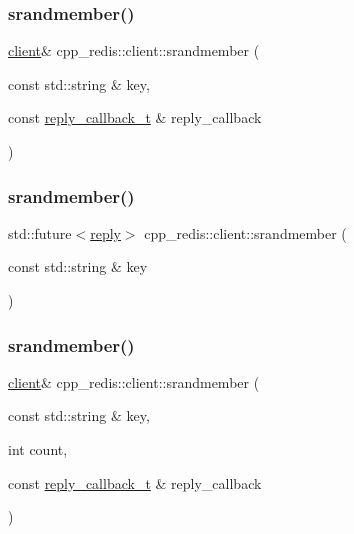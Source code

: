 \mbox{\label{classcpp__redis_1_1client_a69e771fb9562fca08cbf653f8ecb295b}} 
\subsubsection{\texorpdfstring{srandmember()}{srandmember()}\hspace{0.1cm}{\footnotesize\ttfamily [1/4]}}
{\footnotesize\ttfamily \hyperlink{classcpp__redis_1_1client}{client}\& cpp\+\_\+redis\+::client\+::srandmember (\begin{DoxyParamCaption}\item[{const std\+::string \&}]{key,  }\item[{const \hyperlink{classcpp__redis_1_1client_a061a1140d36d2eaeda82b09a0bb3f9f2}{reply\+\_\+callback\+\_\+t} \&}]{reply\+\_\+callback }\end{DoxyParamCaption})}

\mbox{\label{classcpp__redis_1_1client_a2a110009cac1bb5063d468df91802395}} 
\subsubsection{\texorpdfstring{srandmember()}{srandmember()}\hspace{0.1cm}{\footnotesize\ttfamily [2/4]}}
{\footnotesize\ttfamily std\+::future$<$\hyperlink{classcpp__redis_1_1reply}{reply}$>$ cpp\+\_\+redis\+::client\+::srandmember (\begin{DoxyParamCaption}\item[{const std\+::string \&}]{key }\end{DoxyParamCaption})}

\mbox{\label{classcpp__redis_1_1client_a59e0a8886b5f4fa177e93053b9965827}} 
\subsubsection{\texorpdfstring{srandmember()}{srandmember()}\hspace{0.1cm}{\footnotesize\ttfamily [3/4]}}
{\footnotesize\ttfamily \hyperlink{classcpp__redis_1_1client}{client}\& cpp\+\_\+redis\+::client\+::srandmember (\begin{DoxyParamCaption}\item[{const std\+::string \&}]{key,  }\item[{int}]{count,  }\item[{const \hyperlink{classcpp__redis_1_1client_a061a1140d36d2eaeda82b09a0bb3f9f2}{reply\+\_\+callback\+\_\+t} \&}]{reply\+\_\+callback }\end{DoxyParamCaption})}


